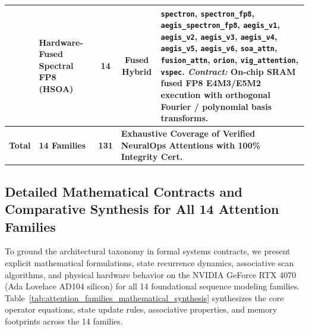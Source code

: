 \begin{table}[t]
{\begin{tabular}{@{}llccp{9.4cm}@{}}
\addlinespace[2pt]
14 & Hardware-Fused Spectral FP8 (HSOA)   & 14 & Fused Hybrid & \texttt{spectron}, \texttt{spectron\_fp8}, \texttt{aegis\_spectron\_fp8}, \texttt{aegis\_v1}, \texttt{aegis\_v2}, \texttt{aegis\_v3}, \texttt{aegis\_v4}, \texttt{aegis\_v5}, \texttt{aegis\_v6}, \texttt{soa\_attn}, \texttt{fusion\_attn}, \texttt{orion}, \texttt{vig\_attention}, \texttt{vspec}. \newline \textit{Contract:} On-chip SRAM fused FP8 E4M3/E5M2 execution with orthogonal Fourier / polynomial basis transforms. \\
\midrule
\textbf{Total} & \textbf{14 Families} & \textbf{131} & \multicolumn{2}{l}{\textbf{Exhaustive Coverage of Verified NeuralOps Attentions with 100\% Integrity Cert.}} \\
\bottomrule
\end{tabular}%
}
\end{table}

\subsection{Detailed Mathematical Contracts and Comparative Synthesis for All 14 Attention Families}
\label{subsec:math_contracts_representative}

To ground the architectural taxonomy in formal systems contracts, we present explicit mathematical formulations, state recurrence dynamics, associative scan algorithms, and physical hardware behavior on the NVIDIA GeForce RTX 4070 (Ada Lovelace AD104 silicon) for all 14 foundational sequence modeling families. Table~\ref{tab:attention_families_mathematical_synthesis} synthesizes the core operator equations, state update rules, associative properties, and memory footprints across the 14 families.

